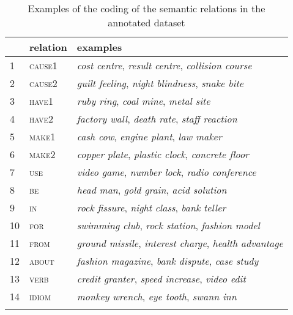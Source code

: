 \begin{table}[htb]
  \begin{tabularx}{0.8\textwidth}{lll}\lsptoprule
&relation&examples \\\midrule  
1&\textsc{cause1}&\emph{cost centre}, \emph{result centre},
\emph{collision course} \\  
2&\textsc{cause2}&\emph{guilt feeling}, \emph{night blindness}, \emph{snake bite}\\  
3&\textsc{have1}&\emph{ruby ring}, \emph{coal mine}, \emph{metal site}\\  
4&\textsc{have2}&\emph{factory wall}, \emph{death rate}, \emph{staff reaction}\\  
5&\textsc{make1}&\emph{cash cow}, \emph{engine plant}, \emph{law maker}\\  
6&\textsc{make2}&\emph{copper plate}, \emph{plastic clock},
\emph{concrete floor}\\  
7&\textsc{use}&\emph{video game}, \emph{number lock}, \emph{radio conference}\\  
8&\textsc{be}&\emph{head man}, \emph{gold grain}, \emph{acid solution}\\  
9&\textsc{in}&\emph{rock fissure}, \emph{night class}, \emph{bank teller}\\  
10&\textsc{for}&\emph{swimming club}, \emph{rock station},
\emph{fashion model}\\  
11&\textsc{from}&\emph{ground missile}, \emph{interest charge},
\emph{health advantage}\\  
12&\textsc{about}&\emph{fashion magazine}, \emph{bank dispute},
\emph{case study}\\  
13&\textsc{verb}&\emph{credit granter}, \emph{speed increase},
\emph{video edit}\\  
14&\textsc{idiom} &\emph{monkey wrench}, \emph{eye tooth}, \emph{swann
inn}\\  \lspbottomrule
  \end{tabularx}
  \caption{Examples of the coding of the semantic relations in the annotated dataset}
  \label{tab:bs2016_relation-coding}
\end{table}
 
